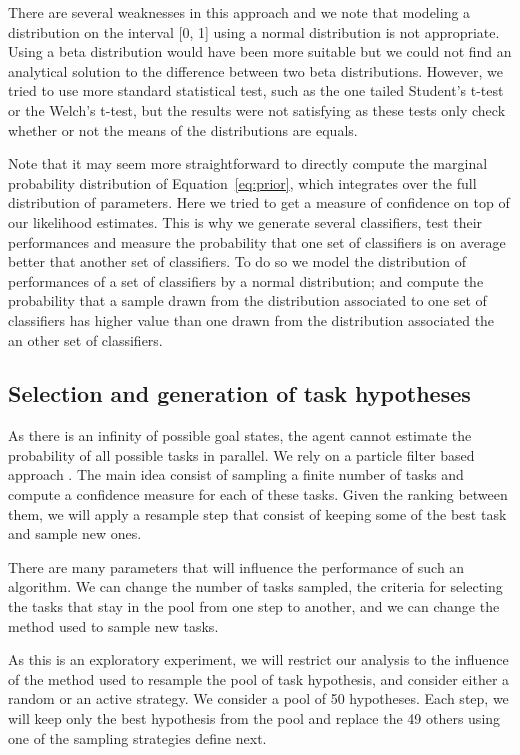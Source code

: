 There are several weaknesses in this approach and we note that modeling a distribution on the interval [0, 1] using a normal distribution is not appropriate. Using a beta distribution would have been more suitable but we could not find an analytical solution to the difference between two beta distributions. However, we tried to use more standard statistical test, such as the one tailed Student's t-test or the Welch's t-test, but the results were not satisfying as these tests only check whether or not the means of the distributions are equals.

Note that it may seem more straightforward to directly compute the marginal probability distribution of Equation~\ref{eq:prior}, which integrates over the full distribution of parameters. Here we tried to get a measure of confidence on top of our likelihood estimates. This is why we generate several classifiers, test their performances and measure the probability that one set of classifiers is on average better that another set of classifiers. To do so we model the distribution of performances of a set of classifiers by a normal distribution; and compute the probability that a sample drawn from the distribution associated to one set of classifiers has higher value than one drawn from the distribution associated the an other set of classifiers.

\subsection{Selection and generation of task hypotheses}
\label{chapter:limitations:continoushypothesis:particlefilter}

As there is an infinity of possible goal states, the agent cannot estimate the probability of all possible tasks in parallel. We rely on a particle filter based approach \cite{gordon1993novel,doucet2009tutorial,thrun2002particle}. The main idea consist of sampling a finite number of tasks and compute a confidence measure for each of these tasks. Given the ranking between them, we will apply a resample step that consist of keeping some of the best task and sample new ones.

There are many parameters that will influence the performance of such an algorithm. We can change the number of tasks sampled, the criteria for selecting the tasks that stay in the pool from one step to another, and we can change the method used to sample new tasks. 

As this is an exploratory experiment, we will restrict our analysis to the influence of the method used to resample the pool of task hypothesis, and consider either a random or an active strategy. We consider a pool of 50 hypotheses. Each step, we will keep only the best hypothesis from the pool and replace the 49 others using one of the sampling strategies define next.

